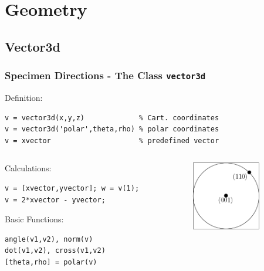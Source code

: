 \section{Geometry}



\subsection*{Vector3d}

\begin{frame}[fragile]
  \frametitle{Specimen Directions - The \MTEX Class \texttt{\bf vector3d}}

  Definition:

\begin{lstlisting}
v = vector3d(x,y,z)             % Cart. coordinates
v = vector3d('polar',theta,rho) % polar coordinates
v = xvector                     % predefined vector
\end{lstlisting}

  \medskip

  \begin{columns}
    \begin{column}{8.5cm}

      Calculations:

\begin{lstlisting}
v = [xvector,yvector]; w = v(1);
v = 2*xvector - yvector;
\end{lstlisting}

    \medskip

    Basic Functions:

\begin{lstlisting}
angle(v1,v2), norm(v)
dot(v1,v2), cross(v1,v2)
[theta,rho] = polar(v)
\end{lstlisting}
  \end{column}
  \begin{column}{3cm}
   \includegraphics[width=3cm]{pic/vector3d}
  \end{column}
\end{columns}



\end{frame}

